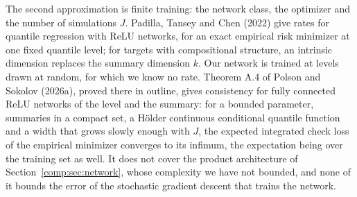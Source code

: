 The second approximation is finite training: the network class, the optimizer and the number of simulations $J$. Padilla, Tansey and Chen (2022) give rates for quantile regression with ReLU networks, for an exact empirical risk minimizer at one fixed quantile level; for targets with compositional structure, an intrinsic dimension replaces the summary dimension $k$. Our network is trained at levels drawn at random, for which we know no rate. Theorem A.4 of Polson and Sokolov (2026a), proved there in outline, gives consistency for fully connected ReLU networks of the level and the summary: for a bounded parameter, summaries in a compact set, a H\"older continuous conditional quantile function and a width that grows slowly enough with $J$, the expected integrated check loss of the empirical minimizer converges to its infimum, the expectation being over the training set as well. It does not cover the product architecture of Section~\ref{comp:sec:network}, whose complexity we have not bounded, and none of it bounds the error of the stochastic gradient descent that trains the network.
